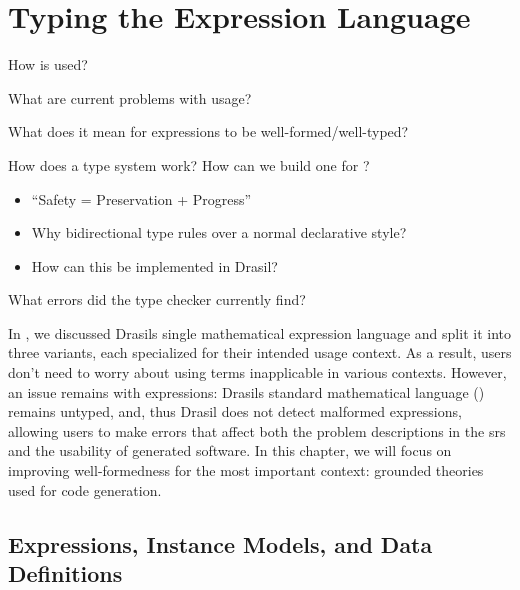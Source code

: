 \chapter{Typing the Expression Language}
\label{chap:typed-expr}

\begin{writingdirectives}
      \item How is \Expr{} used?
      \item What are current problems with \Expr{} usage?
      \item What does it mean for expressions to be well-formed/well-typed?
      \item How does a type system work? How can we build one for \Expr{}?
            \begin{itemize}
                  \item ``Safety = Preservation + Progress'' \cite{Harper2016}
                  \item Why bidirectional type rules over a normal declarative
                        style?
                  \item How can this be implemented in Drasil?
            \end{itemize}
      \item What errors did the type checker currently find?
\end{writingdirectives}

In , we discussed Drasils single mathematical
expression language and split it into three variants, each specialized for their
intended usage context. As a result, users don't need to worry about using terms
inapplicable in various contexts. However, an issue remains with expressions:
Drasils standard mathematical language (\Expr{}) remains untyped, and, thus
Drasil does not detect malformed expressions, allowing users to make errors that
affect both the problem descriptions in the \acs{srs} and the usability of
generated software. In this chapter, we will focus on improving well-formedness
for the most important context: grounded theories used for code generation.

\section{Expressions, Instance Models, and Data Definitions}
\label{chap:typed-expr:sec:expressions-instance-models-and-data-definitions}

